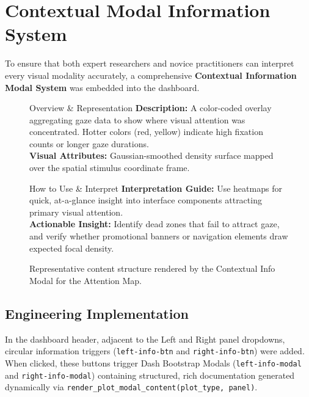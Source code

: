 \documentclass[11pt,a4paper]{article}
\begin{document}
\section{Contextual Modal Information System}
\label{sec:info_modals}

To ensure that both expert researchers and novice practitioners can interpret every visual modality accurately, a comprehensive \textbf{Contextual Information Modal System} was embedded into the dashboard.

\begin{figure}[H]
    \centering
    \begin{minipage}{0.48\textwidth}
        \begin{infobox}{Overview \& Representation}
            \small
            \textbf{Description:} A color-coded overlay aggregating gaze data to show where visual attention was concentrated. Hotter colors (red, yellow) indicate high fixation counts or longer gaze durations.\\
            \textbf{Visual Attributes:} Gaussian-smoothed density surface mapped over the spatial stimulus coordinate frame.
        \end{infobox}
    \end{minipage}
    \hfill
    \begin{minipage}{0.48\textwidth}
        \begin{infobox}[colframe=successgreen]{How to Use \& Interpret}
            \small
            \textbf{Interpretation Guide:} Use heatmaps for quick, at-a-glance insight into interface components attracting primary visual attention.\\
            \textbf{Actionable Insight:} Identify dead zones that fail to attract gaze, and verify whether promotional banners or navigation elements draw expected focal density.
        \end{infobox}
    \end{minipage}
    \caption{Representative content structure rendered by the Contextual Info Modal for the Attention Map.}
    \label{fig:modal_structure}
\end{figure}

\subsection{Engineering Implementation}
In the dashboard header, adjacent to the Left and Right panel dropdowns, circular information triggers (\texttt{left-info-btn} and \texttt{right-info-btn}) were added. When clicked, these buttons trigger Dash Bootstrap Modals (\texttt{left-info-modal} and \texttt{right-info-modal}) containing structured, rich documentation generated dynamically via \texttt{render\_plot\_modal\_content(plot\_type, panel)}.
\end{document}
